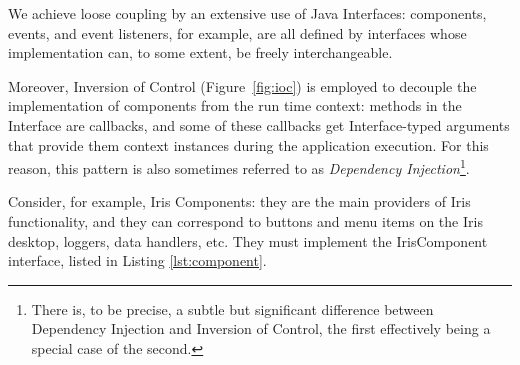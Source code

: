 \documentclass[final,5p,authoryear]{elsarticle}
\begin{document}
We achieve loose coupling by an extensive use of Java Interfaces: components,
events, and event listeners, for example, are all defined by interfaces whose
implementation can, to some extent, be freely interchangeable.

Moreover, Inversion of Control (Figure~\ref{fig:ioc}) is employed to decouple
the implementation of components from the run time context: methods in the
Interface are callbacks, and some of these callbacks get Interface-typed
arguments that provide them context instances during the application execution.
For this reason, this pattern is also sometimes referred to as \emph{Dependency
Injection}\footnote{There is, to be precise, a subtle but significant difference
between Dependency Injection and Inversion of Control, the first effectively
being a special case of the second.}.

Consider, for example, Iris Components: they are the main providers of Iris
functionality, and they can correspond to buttons and menu items on the Iris
desktop, loggers, data handlers, etc. They must implement the IrisComponent
interface, listed in Listing \ref{lst:component}.
\end{document}
